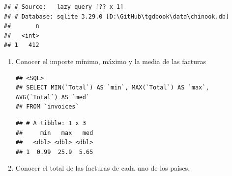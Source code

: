 \documentclass[]{book}
\newenvironment{Shaded}{\begin{snugshade}}{\end{snugshade}}
\newcommand{\KeywordTok}[1]{\textcolor[rgb]{0.13,0.29,0.53}{\textbf{#1}}}
\newcommand{\DataTypeTok}[1]{\textcolor[rgb]{0.13,0.29,0.53}{#1}}
\newcommand{\StringTok}[1]{\textcolor[rgb]{0.31,0.60,0.02}{#1}}
\newcommand{\CommentTok}[1]{\textcolor[rgb]{0.56,0.35,0.01}{\textit{#1}}}
\newcommand{\OtherTok}[1]{\textcolor[rgb]{0.56,0.35,0.01}{#1}}
\newcommand{\OperatorTok}[1]{\textcolor[rgb]{0.81,0.36,0.00}{\textbf{#1}}}
\newcommand{\NormalTok}[1]{#1}
\begin{document}
\begin{Shaded}
\end{Shaded}

\begin{verbatim}
## # Source:   lazy query [?? x 1]
## # Database: sqlite 3.29.0 [D:\GitHub\tgdbook\data\chinook.db]
##       n
##   <int>
## 1   412
\end{verbatim}

\begin{enumerate}
\def\labelenumi{\arabic{enumi}.}
\item
  Conocer el importe mínimo, máximo y la media de las facturas

\begin{Shaded}
\end{Shaded}

\begin{verbatim}
## <SQL>
## SELECT MIN(`Total`) AS `min`, MAX(`Total`) AS `max`, AVG(`Total`) AS `med`
## FROM `invoices`
\end{verbatim}

\begin{Shaded}
\end{Shaded}

\begin{verbatim}
## # A tibble: 1 x 3
##     min   max   med
##   <dbl> <dbl> <dbl>
## 1  0.99  25.9  5.65
\end{verbatim}
\item
  Conocer el total de las facturas de cada uno de los países.


\end{enumerate}
\end{document}

